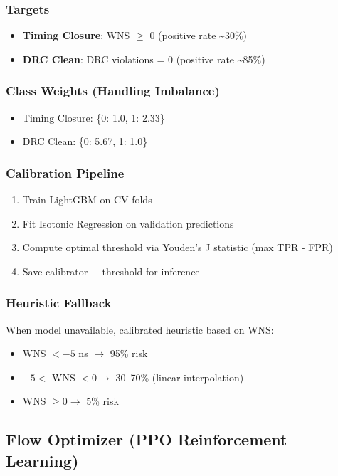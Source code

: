 \documentclass[10pt,conference]{IEEEtran}
\begin{document}
\subsubsection{Targets}
\begin{itemize}
    \item \textbf{Timing Closure}: WNS $\ge$ 0 (positive rate \textasciitilde 30\%)
    \item \textbf{DRC Clean}: DRC violations = 0 (positive rate \textasciitilde 85\%)
\end{itemize}

\subsubsection{Class Weights (Handling Imbalance)}
\begin{itemize}
    \item Timing Closure: \{0: 1.0, 1: 2.33\}
    \item DRC Clean: \{0: 5.67, 1: 1.0\}
\end{itemize}

\subsubsection{Calibration Pipeline}
\begin{enumerate}
    \item Train LightGBM on CV folds
    \item Fit Isotonic Regression on validation predictions
    \item Compute optimal threshold via Youden's J statistic (max TPR - FPR)
    \item Save calibrator + threshold for inference
\end{enumerate}

\subsubsection{Heuristic Fallback}
When model unavailable, calibrated heuristic based on WNS:
\begin{itemize}
    \item WNS $< -5$ ns $\rightarrow$ 95\% risk
    \item $-5 <$ WNS $< 0 \rightarrow$ 30--70\% (linear interpolation)
    \item WNS $\ge 0 \rightarrow$ 5\% risk
\end{itemize}

\subsection{Flow Optimizer (PPO Reinforcement Learning)}
\label{sec:flow_optimizer}
\end{document}
